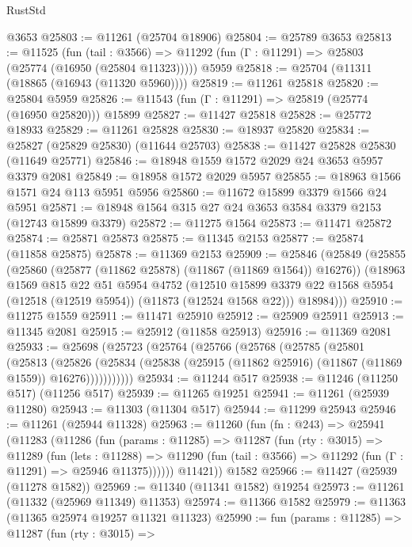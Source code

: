 \begin{lexlean}{RustStd}
\begin{coremodule}
    @3653
@25803 := @11261 (@25704 @18906)
@25804 := @25789 @3653
@25813 := @11525
    (fun (tail : @3566) => @11292 (fun (Γ : @11291) => @25803 (@25774 (@16950 (@25804 @11323)))))
    @5959
@25818 := @25704 (@11311 (@18865 (@16943 (@11320 @5960))))
@25819 := @11261 @25818
@25820 := @25804 @5959
@25826 := @11543 (fun (Γ : @11291) => @25819 (@25774 (@16950 @25820))) @15899
@25827 := @11427 @25818
@25828 := @25772 @18933
@25829 := @11261 @25828
@25830 := @18937 @25820
@25834 := @25827 (@25829 @25830) (@11644 @25703)
@25838 := @11427 @25828 @25830 (@11649 @25771)
@25846 := @18948 @1559 @1572 @2029 @24 @3653 @5957 @3379 @2081
@25849 := @18958 @1572 @2029 @5957
@25855 := @18963 @1566 @1571 @24 @113 @5951 @5956
@25860 := @11672 @15899 @3379 @1566 @24 @5951
@25871 := @18948 @1564 @315 @27 @24 @3653 @3584 @3379 @2153 (@12743 @15899 @3379)
@25872 := @11275 @1564
@25873 := @11471 @25872
@25874 := @25871 @25873
@25875 := @11345 @2153
@25877 := @25874 (@11858 @25875)
@25878 := @11369 @2153
@25909 := @25846
    (@25849
      (@25855
        (@25860 (@25877 (@11862 @25878) (@11867 (@11869 @1564)) @16276))
        (@18963
          @1569
          @815
          @22
          @51
          @5954
          @4752
          (@12510 @15899 @3379 @22 @1568 @5954 (@12518 (@12519 @5954)) (@11873 (@12524 @1568 @22)))
          @18984)))
@25910 := @11275 @1559
@25911 := @11471 @25910
@25912 := @25909 @25911
@25913 := @11345 @2081
@25915 := @25912 (@11858 @25913)
@25916 := @11369 @2081
@25933 := @25698
    (@25723
      (@25764
        (@25766
          (@25768
            (@25785
              (@25801
                (@25813
                  (@25826
                    (@25834
                      (@25838 (@25915 (@11862 @25916) (@11867 (@11869 @1559)) @16276)))))))))))
@25934 := @11244 @517
@25938 := @11246 (@11250 @517) (@11256 @517)
@25939 := @11265 @19251
@25941 := @11261 (@25939 @11280)
@25943 := @11303 (@11304 @517)
@25944 := @11299 @25943
@25946 := @11261 (@25944 @11328)
@25963 := @11260
    (fun (fn : @243) =>
    @25941
      (@11283
        (@11286
          (fun (params : @11285) =>
          @11287
            (fun (rty : @3015) =>
            @11289
              (fun (lets : @11288) =>
              @11290 (fun (tail : @3566) => @11292 (fun (Γ : @11291) => @25946 @11375))))))
        @11421))
    @1582
@25966 := @11427 (@25939 (@11278 @1582))
@25969 := @11340 (@11341 @1582) @19254
@25973 := @11261 (@11332 (@25969 @11349) @11353)
@25974 := @11366 @1582
@25979 := @11363 (@11365 @25974 @19257 @11321 @11323)
@25990 := fun (params : @11285) =>
  @11287
    (fun (rty : @3015) =>

\end{coremodule}
\end{lexlean}
